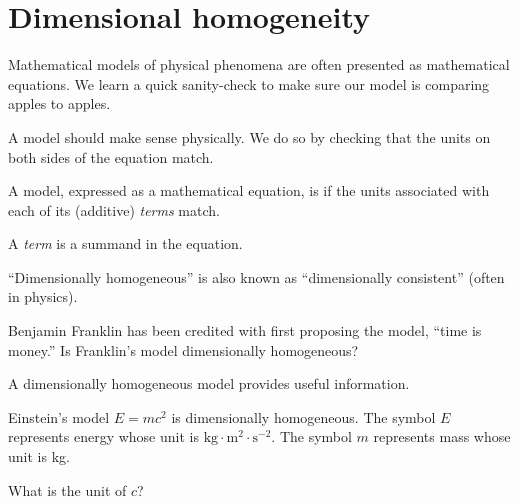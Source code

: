 \documentclass[../main.tex]{subfiles}
\begin{document}
 \section{Dimensional homogeneity}

Mathematical models of physical phenomena are often presented as mathematical equations. We learn a quick sanity-check to make sure our model is comparing apples to apples.

A model should make sense physically. We do so by checking that the units on both sides of the equation match.

\begin{mdframed}[style=simple-compact]
  A model, expressed as a mathematical equation, is  if the units associated with each of its (additive) \emph{terms} match.
\end{mdframed}

A \emph{term} is a summand in the equation.

\faPencil*{} ``Dimensionally homogeneous'' is also known as ``dimensionally consistent'' (often in physics).


\begin{example}
  Benjamin Franklin has been credited with first proposing the model, ``time is money.'' Is Franklin's model dimensionally homogeneous?

\end{example}

A dimensionally homogeneous model provides useful information. 
\begin{example}
  Einstein's model \(E = mc^{2}\) is dimensionally homogeneous. The symbol \(E\) represents energy whose unit is \(\text{kg} \cdot \text{m}^{2} \cdot \text{s}^{-2}\). The symbol \(m\) represents mass whose unit is kg. 

  What is the unit of \(c\)?
\end{example}
\end{document}
